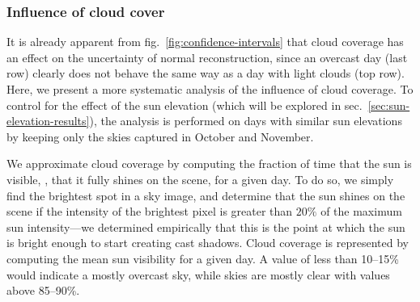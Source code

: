 \subsubsection{Influence of cloud cover}
\label{sec:cloud-cover-results}

It is already apparent from fig.~\ref{fig:confidence-intervals} that cloud coverage has an effect on the uncertainty of normal reconstruction, since an overcast day (last row) clearly does not behave the same way as a day with light clouds (top row). Here, we present a more systematic analysis of the influence of cloud coverage. To control for the effect of the sun elevation (which will be explored in sec.~\ref{sec:sun-elevation-results}), the analysis is performed on days with similar sun elevations by keeping only the skies captured in October and November.

We approximate cloud coverage by computing the fraction of time that the sun is visible, \ie, that it fully shines on the scene, for a given day. To do so, we simply find the brightest spot in a sky image, and determine that the sun shines on the scene if the intensity of the brightest pixel is greater than $20\%$ of the maximum sun intensity---we determined empirically that this is the point at which the sun is bright enough to start creating cast shadows. Cloud coverage is represented by computing the mean sun visibility for a given day. A value of less than 10--15\% would indicate a mostly overcast sky, while skies are mostly clear with values above 85--90\%.

